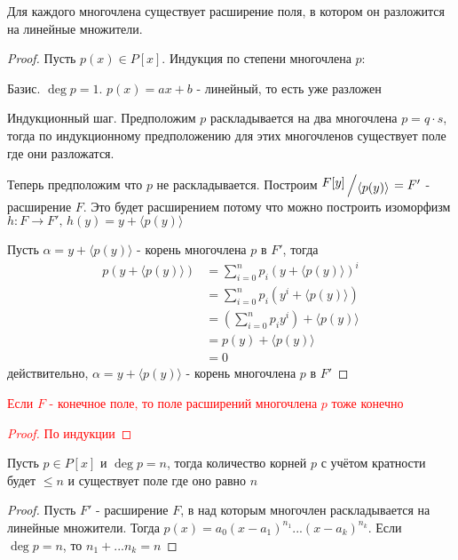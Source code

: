 \documentclass[../main/document.tex]{subfiles}
\begin{document}
\begin{thm}
Для каждого многочлена существует расширение поля, в котором он разложится на линейные множители.
\begin{proof}
Пусть $p(x)\in P[x]$. Индукция по степени многочлена $p$:

Базис. $\deg p=1$. $p(x)=ax+b$ - линейный, то есть уже разложен

Индукционный шаг. Предположим $p$ раскладывается на два многочлена $p=q\cdot s$, тогда по индукционному предположению для этих многочленов существует поле где они разложатся. 

Теперь предположим что $p$ не раскладывается. Построим $\bigslant{F[y]}{\langle p(y)\rangle}=F'$ - расширение $F$. Это будет расширением потому что можно построить изоморфизм $h:F\to F',\,h(y)=y+\langle p(y)\rangle$

Пусть $\alpha = y+\langle p(y)\rangle$ - корень многочлена $p$ в $F'$, тогда
\begin{align*}
p(y+\langle p(y)\rangle)&=\sum\limits_{i=0}^np_i(y+\langle p(y)\rangle)^i\\
&=\sum\limits_{i=0}^np_i(y^i+\langle p(y)\rangle)\\
&=(\sum\limits_{i=0}^np_iy^i)+\langle p(y)\rangle\\
&=p(y)+\langle p(y)\rangle\\
&=0
\end{align*}
действительно, $\alpha = y+\langle p(y)\rangle$ - корень многочлена $p$ в $F'$
\end{proof}
\end{thm}
\begin{exm}

\end{exm}
\textcolor{red}{
\begin{cnsq}
Если $F$ - конечное поле, то поле расширений многочлена $p$ тоже конечно
\begin{proof}
По индукции
\end{proof}
\end{cnsq}}
\begin{cnsq}
Пусть $p\in P[x]$ и $\deg p =n$, тогда количество корней $p$ с учётом кратности будет $\leq n$ и существует поле где оно равно $n$
\begin{proof}
Пусть $F'$ - расширение $F$, в над которым многочлен раскладывается на линейные множители. Тогда $p(x)=a_0(x-a_1)^{n_1}...(x-a_k)^{n_k}$. Если $\deg p =n$, то $n_1+...n_k=n$
\end{proof}
\end{cnsq}
\end{document}

